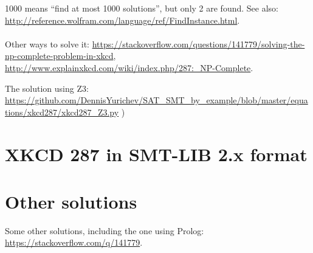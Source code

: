 1000 means ``find at most 1000 solutions'', but only 2 are found.
See also: \url{http://reference.wolfram.com/language/ref/FindInstance.html}.\\
\\
Other ways to solve it:
\url{https://stackoverflow.com/questions/141779/solving-the-np-complete-problem-in-xkcd},
\url{http://www.explainxkcd.com/wiki/index.php/287:_NP-Complete}.

The solution using Z3: \url{https://github.com/DennisYurichev/SAT_SMT_by_example/blob/master/equations/xkcd287/xkcd287_Z3.py} )

\section{XKCD 287 in SMT-LIB 2.x format}



\section{Other solutions}

Some other solutions, including the one using Prolog:
\url{https://stackoverflow.com/q/141779}.

